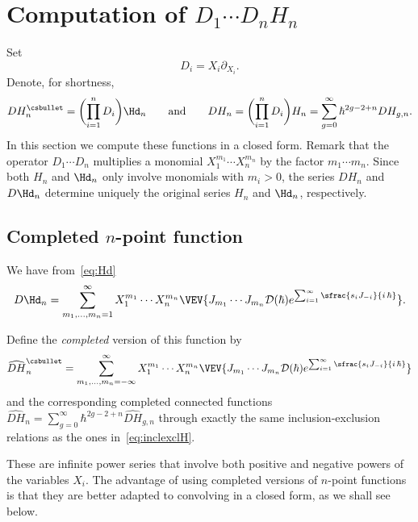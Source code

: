 \section{Computation of \texorpdfstring{$D_1\cdots D_n H_n$}{D1...DnHn}} \label{sec:CompDH}

Set
\begin{equation*}
D_i=X_i\partial_{X_i}.
\end{equation*}
Denote, for shortness,
\begin{equation*}
DH^\csbullet_n=\biggl(\prod_{i=1}^n D_i \biggr)\Hd_n\qquad \text{and} \qquad
DH_n= \biggl(\prod_{i=1}^n D_i \biggr)H_n
=\sum_{g=0}^\infty \hbar^{2g-2+n}DH_{g,n}.
\end{equation*}
In this section we compute these functions in a closed form. Remark that the operator $D_1\cdots D_n$ multiplies a monomial $X_1^{m_1}\cdots X_n^{m_n}$ by the factor $m_1\cdots m_n$. Since both $H_n$ and $\Hd_n$ only involve monomials with $m_i>0$, the series $DH_n$ and $D\Hd_n$ determine uniquely the original series $H_n$ and $\Hd_n$, respectively.

\subsection{Completed \texorpdfstring{$n$}{n}-point function}
We have from~\eqref{eq:Hd}
\begin{equation}\label{eq:DHd}
D\Hd_n=\sum_{m_1,\dots,m_n=1}^\infty X_1^{m_1}\cdots X_n^{m_n}
\VEV{J_{m_1}\cdots J_{m_n}\mathcal{D}(\hbar)e^{\sum_{i=1}^\infty \sfrac{s_iJ_{-i}}{i\,\hbar}}}.
\end{equation}

Define the \emph{completed} version of this function by
\begin{equation}\label{eq:cDHd}
\widehat{DH}^\csbullet_n=\sum_{m_1,\dots,m_n=-\infty}^\infty X_1^{m_1}\cdots X_n^{m_n}
\VEV{J_{m_1}\cdots J_{m_n}\mathcal{D}(\hbar)e^{\sum_{i=1}^\infty \sfrac{s_iJ_{-i}}{i\,\hbar}}}
\end{equation}
and the corresponding completed connected functions $\widehat{D H}_n=\sum_{g=0}^\infty \hbar^{2g-2+n}\widehat{D H}_{g,n}$ through exactly the same inclusion-exclusion relations as the ones in~\eqref{eq:inclexclH}.

These are infinite power series that involve both positive and negative powers of the variables $X_i$. The advantage of using completed versions of $n$-point functions is that they are better adapted to convolving in a closed form, as we shall see below.

